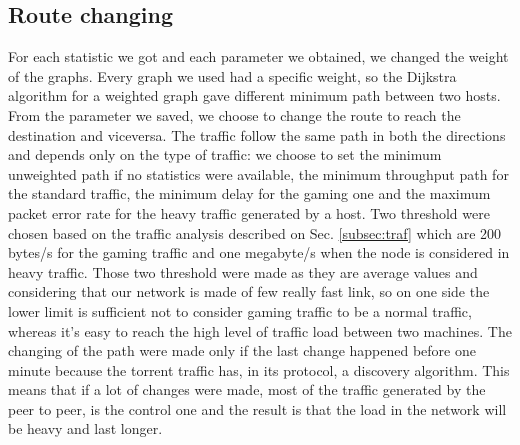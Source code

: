 \documentclass[article,10pt]{IEEEtran}
\begin{document}
\subsection{Route changing}


For each statistic we got and each parameter we obtained, we changed the weight of the graphs. Every graph we used had a specific weight, so the
Dijkstra algorithm for a weighted graph gave different minimum path between two hosts. From the parameter we saved, we choose to change the
route to reach the destination and viceversa. The traffic follow the same path in both the directions and depends only on the type of traffic:
we choose to set the minimum unweighted path if no statistics were available, the minimum throughput path for the standard traffic, the minimum
delay for the gaming one and the maximum packet error rate for the heavy traffic generated by a host.
Two threshold were chosen based on the traffic analysis described on Sec. \ref{subsec:traf} which are 200 bytes/s for the gaming traffic and one megabyte/s
when the node is considered in heavy traffic. Those two threshold were made as they are average values and considering that our network is made of few really fast link,
so on one side the lower limit is sufficient not to consider gaming traffic to be a normal traffic, whereas it's easy to reach the high level of traffic load between two machines.
The changing of the path were made only if the last change happened before one minute because the torrent traffic has, in its protocol, a discovery
algorithm. This means that if a lot of changes were made, most of the traffic generated by the peer to peer, is the control one and the result is that the
load in the network will be heavy and last longer.
\end{document}
